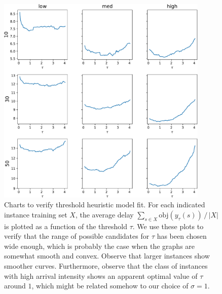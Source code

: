 \documentclass[a4paper]{article}
\theoremstyle{definition}
\theoremstyle{plain}
\begin{document}
\begin{figure}
  \centering
  \includegraphics[width=0.9\textwidth]{figures/single/tau_fit.pdf}
  \caption{Charts to verify threshold heuristic model fit. For each indicated
    instance training set $X$, the average delay
    $\sum_{s \in X} \textrm{obj}(y_{\tau}(s)) \, / \, {|X|}$ is plotted as a function of the
    threshold $\tau$. We use these plots to verify that the range of possible
    candidates for $\tau$ has been chosen wide enough, which is probably the case
    when the graphs are somewhat smooth and convex. Observe that larger
    instances show smoother curves. Furthermore, observe that the class of
    instances with high arrival intensity shows an apparent optimal value of $\tau$
    around $1$, which might be related somehow to our choice of $\sigma = 1$.}
  \label{fig:tau_fit}
\end{figure}
\end{document}
